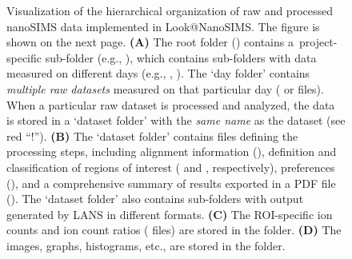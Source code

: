 \begin{figure}[!h]
\centering
\caption{\label{fig2:data_organization}%
	Visualization of the hierarchical organization of raw and processed nanoSIMS data implemented in Look@NanoSIMS. The figure is shown on the next page. %
  \textbf{(A)} The root folder () contains a~project-specific sub-folder (e.g., ), which contains sub-folders with data measured on different days (e.g., , ). %
  The `day folder' contains \emph{multiple raw datasets} measured on that particular day ( or  files). %
  When a particular raw dataset is processed and analyzed, the data is stored in a `dataset folder' with the \emph{same name} as the dataset (see red ``!''). %
  \textbf{(B)} The `dataset folder' contains files defining the processing steps, including alignment information (), definition and classification of regions of interest ( and , respectively), preferences (), and a comprehensive summary of results exported in a PDF file (). %
  The `dataset folder' also contains sub-folders with output generated by LANS in different formats. %
    \textbf{(C)} The ROI-specific ion counts and ion count ratios ( files) are stored in the  folder. %
    \textbf{(D)} The images, graphs, histograms, etc., are stored in the  folder.}%
\end{figure}

